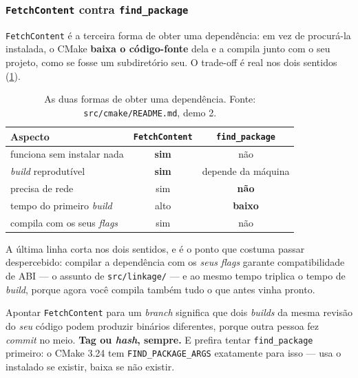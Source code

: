 \subsubsection{\texttt{FetchContent} contra \texttt{find\_package}}

\texttt{FetchContent} é a terceira forma de obter uma dependência: em vez de
procurá-la instalada, o CMake \textbf{baixa o código-fonte} dela e a compila
junto com o seu projeto, como se fosse um subdiretório seu. O trade-off é real
nos dois sentidos (\cref{tab:fetchcontent}).

\begin{table}[htbp]
\centering
\caption{As duas formas de obter uma dependência. Fonte:
         \texttt{src/cmake/README.md}, demo 2.}
\label{tab:fetchcontent}
\footnotesize
\begin{tabular}{@{}lcc@{}}
\toprule
\textbf{Aspecto} & \textbf{\texttt{FetchContent}} & \textbf{\texttt{find\_package}} \\
\midrule
funciona sem instalar nada     & \textbf{sim}   & não \\
\emph{build} reprodutível      & \textbf{sim}   & depende da máquina \\
precisa de rede                & sim            & \textbf{não} \\
tempo do primeiro \emph{build} & alto           & \textbf{baixo} \\
compila com os seus \emph{flags} & sim          & não \\
\bottomrule
\end{tabular}
\end{table}

A última linha corta nos dois sentidos, e é o ponto que costuma passar
despercebido: compilar a dependência com os \emph{seus} \emph{flags} garante
compatibilidade de ABI --- o assunto de \texttt{src/linkage/} --- e ao mesmo
tempo triplica o tempo de \emph{build}, porque agora você compila também tudo
o que antes vinha pronto.

\begin{armadilha}
Apontar \texttt{FetchContent} para um \emph{branch} significa que dois
\emph{builds} da mesma revisão do \emph{seu} código podem produzir binários
diferentes, porque outra pessoa fez \emph{commit} no meio. \textbf{Tag ou
\emph{hash}, sempre.} E prefira tentar \texttt{find\_package} primeiro: o CMake
3.24 tem \texttt{FIND\_PACKAGE\_ARGS} exatamente para isso --- usa o instalado
se existir, baixa se não existir.
\end{armadilha}

